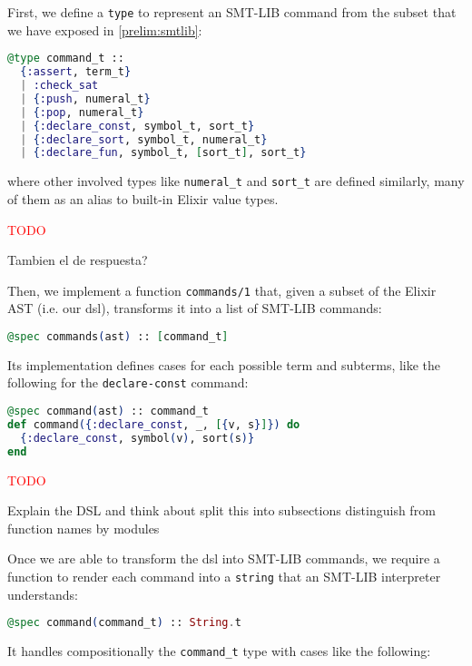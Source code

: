 First, we define a \verb|type| to represent an SMT-LIB command from the subset
that we have exposed in \ref{prelim:smtlib}:

\begin{lstlisting}[language=elixir,numbers=none,frame=none]
@type command_t ::
  {:assert, term_t}
  | :check_sat
  | {:push, numeral_t}
  | {:pop, numeral_t}
  | {:declare_const, symbol_t, sort_t}
  | {:declare_sort, symbol_t, numeral_t}
  | {:declare_fun, symbol_t, [sort_t], sort_t}
\end{lstlisting}

where other involved types like \verb|numeral_t| and \verb|sort_t| are defined 
similarly, many of them as an alias to built-in Elixir value types.

\textcolor{red}{TODO} 

Tambien el de respuesta?

Then, we implement a function \verb|commands/1| that, given a subset of the 
Elixir AST (i.e. our \gls{dsl}), transforms it into a list of SMT-LIB commands:

\begin{lstlisting}[language=elixir,numbers=none,frame=none]
@spec commands(ast) :: [command_t]
\end{lstlisting}
  
Its implementation defines cases for each possible term and subterms, 
like the following for the \verb|declare-const| command:

\begin{lstlisting}[language=elixir,numbers=none,frame=none]
@spec command(ast) :: command_t
def command({:declare_const, _, [{v, s}]}) do
  {:declare_const, symbol(v), sort(s)}
end
\end{lstlisting}

\textcolor{red}{TODO} 

Explain the DSL and think about split this into subsections
distinguish from function names by modules

Once we are able to transform the \gls{dsl} into SMT-LIB commands, we require 
a function to render each command into a \verb|string| that an SMT-LIB
interpreter understands:

\begin{lstlisting}[language=elixir,numbers=none,frame=none]
@spec command(command_t) :: String.t
\end{lstlisting}

It handles compositionally the \verb|command_t| type with cases like the
following:

